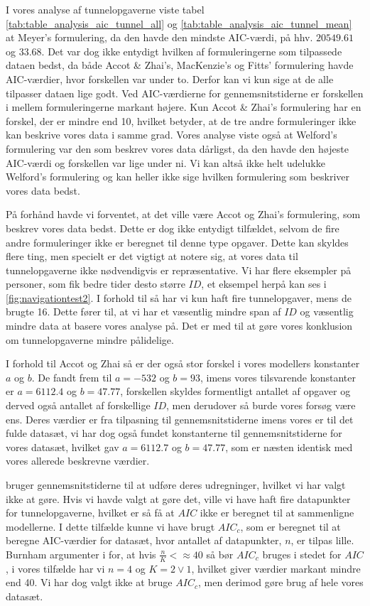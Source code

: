 I vores analyse af tunnelopgaverne viste tabel \ref{tab:table_analysis_aic_tunnel_all} og \ref{tab:table_analysis_aic_tunnel_mean} at Meyer's formulering, da den havde den mindste AIC-værdi, på hhv. $20549.61$ og $33.68$. Det var dog ikke entydigt hvilken af formuleringerne som tilpassede dataen bedst, da både Accot \& Zhai's, MacKenzie's og Fitts' formulering havde AIC-værdier, hvor forskellen var under to. Derfor kan vi kun sige at de alle tilpasser dataen lige godt. Ved AIC-værdierne for gennemsnitstiderne er forskellen i mellem formuleringerne markant højere. Kun Accot \& Zhai's formulering har en forskel, der er mindre end 10, hvilket betyder, at de tre andre formuleringer ikke kan beskrive vores data i samme grad. Vores analyse viste også at Welford's formulering var den som beskrev vores data dårligst, da den havde den højeste AIC-værdi og forskellen var lige under ni. Vi kan altså ikke helt udelukke Welford's formulering og kan heller ikke sige hvilken formulering som beskriver vores data bedst.

På forhånd havde vi forventet, at det ville være Accot og Zhai's formulering, som beskrev vores data bedst. Dette er dog ikke entydigt tilfældet, selvom de fire andre formuleringer ikke er beregnet til denne type opgaver. Dette kan skyldes flere ting, men specielt er det vigtigt at notere sig, at vores data til tunnelopgaverne ikke nødvendigvis er repræsentative. Vi har flere eksempler på personer, som fik bedre tider desto større $ID$, et eksempel herpå kan ses i \ref{fig:navigationtest2}. I forhold til \cite{accot1997} så har vi kun haft fire tunnelopgaver, mens de brugte 16. Dette fører til, at vi har et væsentlig mindre span af $ID$ og væsentlig mindre data at basere vores analyse på. Det er med til at gøre vores konklusion om tunnelopgaverne mindre pålidelige.

I forhold til Accot og Zhai så er der også stor forskel i vores modellers konstanter $a$ og $b$. De fandt frem til $a=-532$ og $b=93$, imens vores tilsvarende konstanter er $a=6112.4$ og $b=47.77$, forskellen skyldes formentligt antallet af opgaver og derved også antallet af forskellige $ID$, men derudover så burde vores forsøg være ens. Deres værdier er fra tilpasning til gennemsnitstiderne imens vores er til det fulde datasæt, vi har dog også fundet konstanterne til gennemsnitstiderne for vores datasæt, hvilket gav $a=6112.7$ og $b=47.77$, som er næsten identisk med vores allerede beskrevne værdier.

\cite{accot1997} bruger gennemsnitstiderne til at udføre deres udregninger, hvilket vi har valgt ikke at gøre. Hvis vi havde valgt at gøre det, ville vi have haft fire datapunkter for tunnelopgaverne, hvilket er så få at $AIC$ ikke er beregnet til at sammenligne modellerne. I dette tilfælde kunne vi have brugt $AIC_c$, som er beregnet til at beregne AIC-værdier for datasæt, hvor antallet af datapunkter, $n$, er tilpas lille. Burnham argumenter i \cite{burnham2004} for, at hvis $\frac{n}{K} <\approx 40$ så bør $AIC_c$ bruges i stedet for $AIC$, i vores tilfælde har vi $n=4$ og $K=2 \vee 1$, hvilket giver værdier markant mindre end 40. Vi har dog valgt ikke at bruge $AIC_c$, men derimod gøre brug af hele vores datasæt.

